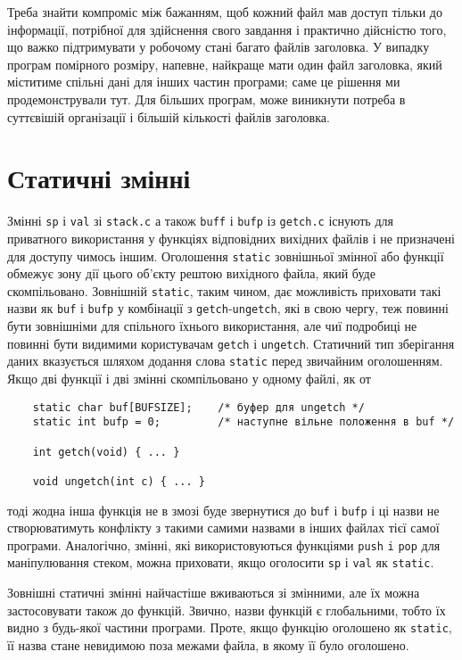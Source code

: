 \documentclass[a4paper,12pt]{book}
\begin{document}
  Треба знайти компроміс між бажанням, щоб кожний файл мав доступ тільки до
  інформації, потрібної для здійснення свого завдання і практично дійсністю того, що
  важко підтримувати у робочому стані багато файлів заголовка. У випадку програм
  помірного розміру, напевне, найкраще мати один файл заголовка, який міститиме спільні
  дані для інших частин програми; саме це рішення ми продемонстрували тут. Для більших
  програм, може виникнути потреба в суттєвішій організації і більшій кількості файлів
  заголовка.

\section{Статичні змінні}


  Змінні \texttt{sp} і \texttt{val} зі \texttt{stack.c} а також \texttt{buff} і
  \texttt{bufp} із \texttt{getch.c} існують для приватного використання у функціях
  відповідних вихідних файлів і не призначені для доступу чимось іншим. Оголошення
  \texttt{static} зовнішньої змінної або функції обмежує зону дії цього об'єкту рештою
  вихідного файла, який буде скомпільовано. Зовнішній \texttt{static}, таким чином, дає
  можливість приховати такі назви як \texttt{buf} і \texttt{bufp} у комбінації з
  \texttt{getch}-\texttt{ungetch}, які в свою чергу, теж повинні бути зовнішніми для
  спільного їхнього використання, але чиї подробиці не повинні бути видимими користувачам
  \texttt{getch} і \texttt{ungetch}. Статичний тип зберігання даних вказується шляхом
  додання слова \texttt{static} перед звичайним оголошенням. Якщо дві функції і дві змінні
  скомпільовано у одному файлі, як от
  \begin{verbatim}
    static char buf[BUFSIZE];    /* буфер для ungetch */
    static int bufp = 0;         /* наступне вільне положення в buf */

    int getch(void) { ... }

    void ungetch(int c) { ... }
  \end{verbatim}
  тоді жодна інша функція не в змозі буде звернутися до \texttt{buf} і \texttt{bufp} і ці
  назви не створюватимуть конфлікту з такими самими назвами в інших файлах тієї самої
  програми. Аналогічно, змінні, які використовуються функціями \texttt{push} \texttt{i}
  \texttt{pop} для маніпулювання стеком, можна приховати, якщо оголосити \texttt{sp} і
  \texttt{val} як \texttt{static}.

  Зовнішні статичні змінні найчастіше вживаються зі змінними, але їх можна застосовувати
  також до функцій. Звично, назви функцій є глобальними, тобто їх видно з
  будь-якої частини програми. Проте, якщо функцію оголошено як \texttt{static}, її назва
  стане невидимою поза межами файла, в якому її було оголошено.
\end{document}
